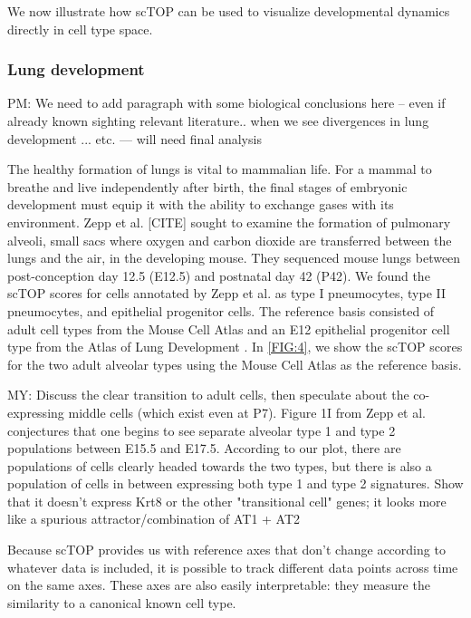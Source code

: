 \documentclass[aps,superscriptaddress, notitlepage,longbibliography]{revtex4-1}
\begin{document}
We now illustrate how scTOP can be used to visualize developmental dynamics directly in cell type space. 

\subsubsection{Lung development}
{\color{red} PM: We need to add paragraph with some biological conclusions here -- even if already known sighting relevant literature.. when we see  divergences in lung development ... etc. --- will need final analysis}

The healthy formation of lungs is vital to mammalian life. For a mammal to breathe and live independently after birth, the final stages of embryonic development must equip it with the ability to exchange gases with its environment. Zepp et al. [CITE] sought to examine the formation of pulmonary alveoli, small sacs where oxygen and carbon dioxide are transferred between the lungs and the air, in the developing mouse. They sequenced mouse lungs between post-conception day 12.5 (E12.5) and postnatal day 42 (P42). We found the scTOP scores for cells annotated by Zepp et al. as type I pneumocytes, type II pneumocytes, and epithelial progenitor cells. The reference basis consisted of adult cell types from the Mouse Cell Atlas and an E12 epithelial progenitor cell type from the Atlas of Lung Development \cite{negretti_single-cell_2021}. In \ref{FIG:4}, we show the scTOP scores for the two adult alveolar types using the Mouse Cell Atlas as the reference basis. 

{\color{red} MY: Discuss the clear transition to adult cells, then speculate about the co-expressing middle cells (which exist even at P7). Figure 1I from Zepp et al. conjectures that one begins to see separate alveolar type 1 and type 2 populations between E15.5 and E17.5. According to our plot, there are populations of cells clearly headed towards the two types, but there is also a population of cells in between expressing both type 1 and type 2 signatures. Show that it doesn't express Krt8 or the other "transitional cell" genes; it looks more like a spurious attractor/combination of AT1 + AT2}

Because scTOP provides us with reference axes that don't change according to whatever data is included, it is possible to track different data points across time on the same axes. These axes are also easily interpretable: they measure the similarity to a canonical known cell type.
\end{document}
